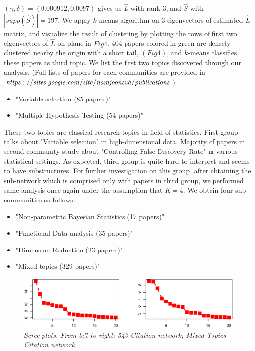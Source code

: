 \documentclass{article}
\begin{document}
\noindent $(\gamma,\delta) = (0.000912,0.0097)$ gives us $\hat{L}$ with rank 3, and $\hat{S}$ with $|supp(\hat{S})|=197$. We apply $k$-means algorithm on 3 eigenvectors of estimated $\hat{L}$ matrix, and visualize the result of clustering by plotting the rows of first two eigenvectors of $\hat{L}$ on plane in $Fig 4$. 404 papers colored in green are densely clustered nearby the origin with a short tail, $(Fig 4)$, and $k$-means classifies these papers as third topic. We list the first two topics discovered through our analysis. (Full lists of papers for each communities are provided in $\it https://sites.google.com/site/namjoonsuh/publications$)

\begin{itemize}
  \item "Variable selection (85 papers)"
  \item "Multiple Hypothesis Testing (54 papers)"
\end{itemize}

\noindent These two topics are classical research topics in field of statistics. First group talks about "Variable selection" in high-dimensional data. Majority of papers in second community study about "Controlling False Discovery Rate" in various statistical settings. As expected, third group is quite hard to interpret and seems to have substructures. For further investigation on this group, after obtaining the sub-network which is comprised only with papers in third group, we performed same analysis once again under the assumption that $K=4$. We obtain four sub-communities as follows:

\begin{itemize}
  \item "Non-parametric Bayesian Statistics (17 papers)"
  \item "Functional Data analysis (35 papers)"
  \item "Dimension Reduction (23 papers)"
  \item "Mixed topics (329 papers)"
\end{itemize}

\begin{figure}[b]
\includegraphics[width=1\textwidth]{Fig4.eps}
\caption{\it Scree plots. From left to right: 543-Citation network, Mixed Topics-Citation network.}
\label{fig:figure4}
\end{figure}
\end{document}
